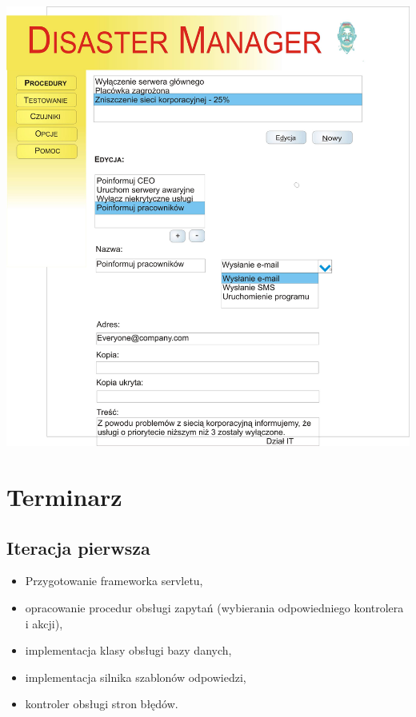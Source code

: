 \documentclass[a4paper,12pt]{article}
\begin{document}
\begin{center}
	\includegraphics[width=135mm]{widoki/procedury.jpg}
\end{center}


\section{Terminarz}

\subsection{Iteracja pierwsza}

\begin{itemize}
	\item Przygotowanie frameworka servletu,
	\item opracowanie procedur obsługi zapytań (wybierania odpowiedniego kontrolera i akcji),
	\item implementacja klasy obsługi bazy danych,
	\item implementacja silnika szablonów odpowiedzi,
	\item kontroler obsługi stron błędów.
\end{itemize}
\end{document}
